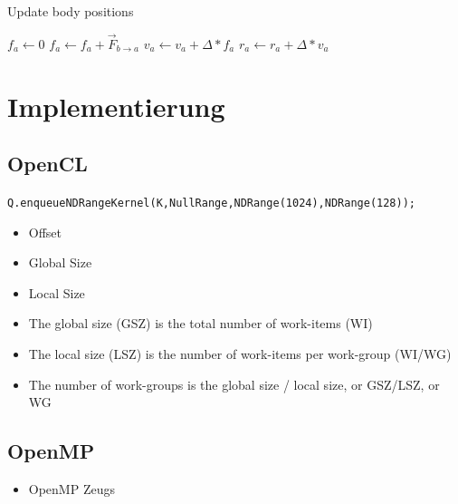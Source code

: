 \documentclass{beamer}
\begin{document}
\begin{frame}


\begin{algorithm}[H]
\caption{Update body positions}
\begin{algorithmic}[1]
      \State $f_a \gets 0$ 
        \State $f_a \gets f_a + \vec{F}^{\,}_{b\rightarrow a}$ 
      \EndFor
   \EndFor
      \State $v_a \gets v_a + \Delta * f_a$ 
      \State $r_a \gets r_a + \Delta * v_a$ 
   \EndFor
\EndProcedure
\end{algorithmic}
\end{algorithm}


\end{frame}

\section{Implementierung}

\subsection{OpenCL}
\begin{frame}

\small{\texttt{Q.enqueueNDRangeKernel(K,NullRange,NDRange(1024),NDRange(128));}}
\begin{itemize}
  \item Offset
  \item Global Size
  \item Local Size
  \item The global size (GSZ) is the total number of work-items (WI)
  \item The local size (LSZ) is the number of work-items per work-group (WI/WG)
  \item The number of work-groups is the global size / local size, or GSZ/LSZ, or WG
\end{itemize}
\end{frame}

\subsection{OpenMP}
\begin{frame}
\begin{itemize}
  \item OpenMP Zeugs
\end{itemize}
\end{frame}
\end{document}
